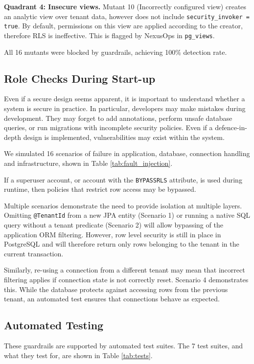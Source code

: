 \documentclass[conference]{IEEEtran}
\begin{document}
\textbf{Quadrant 4: Insecure views.} Mutant 10 (Incorrectly configured view) creates an analytic view over tenant data, however does not include \texttt{security\_invoker = true}. By default, permissions on this view are applied according to the creator, therefore RLS is ineffective. This is flagged by NexusOps in \texttt{pg\_views}.

All 16 mutants were blocked by guardrails, achieving 100\% detection rate.

\subsection{Role Checks During Start-up}
Even if a secure design seems apparent, it is important to understand whether a system is secure in practice. In particular, developers may make mistakes during development. They may forget to add annotations, perform unsafe database queries, or run migrations with incomplete security policies. Even if a defence-in-depth design is implemented, vulnerabilities may exist within the system.

We simulated 16 scenarios of failure in application, database, connection handling and infrastructure, shown in Table \ref{tab:fault_injection}.

If a superuser account, or account with the \texttt{BYPASSRLS} attribute, is used during runtime, then policies that restrict row access may be bypassed.

Multiple scenarios demonstrate the need to provide isolation at multiple layers. Omitting \texttt{@TenantId} from a new JPA entity (Scenario 1) or running a native SQL query without a tenant predicate (Scenario 2) will allow bypassing of the application ORM filtering. However, row level security is still in place in PostgreSQL and will therefore return only rows belonging to the tenant in the current transaction.

Similarly, re-using a connection from a different tenant may mean that incorrect filtering applies if connection state is not correctly reset. Scenario 4 demonstrates this. While the database protects against accessing rows from the previous tenant, an automated test ensures that connections behave as expected.

\subsection{Automated Testing}
These guardrails are supported by automated test suites. The 7 test suites, and what they test for, are shown in Table \ref{tab:tests}.
\end{document}
